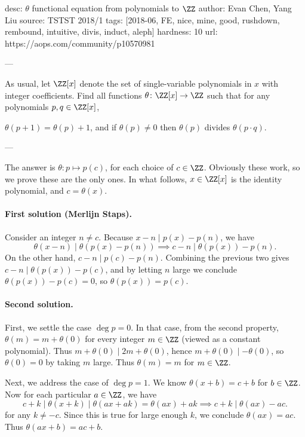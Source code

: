 desc: $\theta$ functional equation from polynomials to $\ZZ$
author: Evan Chen, Yang Liu
source: TSTST 2018/1
tags: [2018-06, FE, nice, mine, good, rushdown, rembound, intuitive, divis, induct, aleph]
hardness: 10
url: https://aops.com/community/p10570981

---

As usual, let $\ZZ[x]$ denote the set of single-variable
polynomials in $x$ with integer coefficients.
Find all functions $\theta \colon \ZZ[x] \to \ZZ$
such that for any polynomials $p,q \in \ZZ[x]$,
\begin{itemize}
  \ii $\theta(p+1) = \theta(p)+1$, and
  \ii if $\theta(p) \neq 0$
  then $\theta(p)$ divides $\theta(p \cdot q)$.
\end{itemize}

---

The answer is $\theta : p \mapsto p(c)$, for each choice of $c \in \ZZ$.
Obviously these work, so we prove these are the only ones.
In what follows, $x \in \ZZ[x]$ is the identity polynomial,
and $c = \theta(x)$.

\paragraph{First solution (Merlijn Staps).}
Consider an integer $n \neq c$.
Because $x-n \mid p(x)-p(n)$, we have
\[ \theta(x-n) \mid \theta(p(x)-p(n))
  \implies c - n \mid \theta(p(x)) - p(n).
\]
On the other hand, $c - n \mid p(c) - p(n)$.
Combining the previous two gives $c - n \mid \theta(p(x)) - p(c)$,
and by letting $n$ large we conclude
$\theta(p(x)) - p(c) = 0$, so $\theta(p(x)) = p(c)$.

\paragraph{Second solution.}
First, we settle the case $\deg p = 0$.
In that case, from the second property,
$\theta(m) = m + \theta(0)$ for every integer $m \in \ZZ$
(viewed as a constant polynomial).
Thus $m + \theta(0) \mid 2m + \theta(0)$,
hence $m + \theta(0) \mid -\theta(0)$,
so $\theta(0) = 0$ by taking $m$ large.
Thus $\theta(m) = m$ for $m \in \ZZ$.

Next, we address the case of $\deg p = 1$.
We know $\theta(x+b) = c+b$ for $b \in \ZZ$.
Now for each particular $a \in \ZZ$,
we have
\[ c+k \mid \theta(x+k) \mid \theta(ax+ak) = \theta(ax) + ak
  \implies c+k \mid \theta(ax) - ac. \]
for any $k \neq -c$.
Since this is true for large enough $k$,
we conclude $\theta(ax) = ac$.
Thus $\theta(ax+b) = ac+b$.

